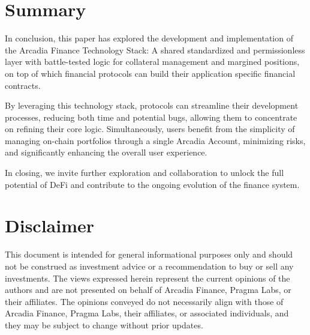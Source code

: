 \documentclass[sigconf,nonacm]{acmart}
\begin{document}
\balance
\section{Summary}
\label{sec:summary}
In conclusion, this paper has explored the development and implementation of the Arcadia Finance Technology Stack:
A shared standardized and permissionless layer with battle-tested logic for collateral management and margined positions,
on top of which financial protocols can build their application specific financial contracts.

By leveraging this technology stack, protocols can streamline their development processes, reducing both time and potential bugs,
allowing them to concentrate on refining their core logic. 
Simultaneously, users benefit from the simplicity of managing on-chain portfolios through a single Arcadia Account, minimizing risks,
and significantly enhancing the overall user experience.

In closing, we invite further exploration and collaboration to unlock the full potential of DeFi and contribute to the ongoing evolution of the finance system.

\section*{Disclaimer}
This document is intended for general informational purposes only and should not be construed as investment advice or
a recommendation to buy or sell any investments.
The views expressed herein represent the current opinions of the authors and are not presented on behalf of Arcadia Finance, Pragma Labs, or their affiliates.
The opinions conveyed do not necessarily align with those of Arcadia Finance, Pragma Labs, their affiliates, or associated individuals,
and they may be subject to change without prior updates.



\end{document}
